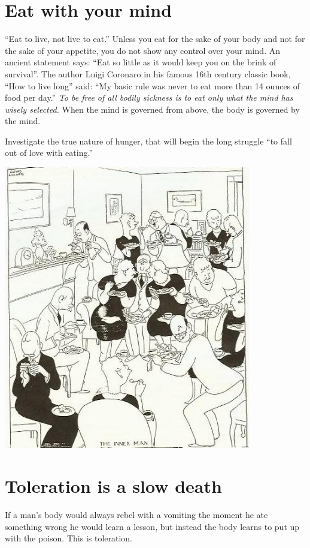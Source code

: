 \documentclass[12pt,letterpaper]{article}
\begin{document}
\section{Eat with your mind}

``Eat to live, not live to eat.'' Unless you eat for the sake of your
body and not for the sake of your appetite, you do not show any
control over your mind. An ancient statement says: ``Eat so little as
it would keep you on the brink of survival''. The author Luigi
Coronaro in his famous 16th century classic book, ``How to live
long'' said: ``My basic rule was never to eat more than 14 ounces of
food per day.'' \emph{To be free of all bodily sickness is to eat only
what the mind has wisely selected.} When the mind is governed from
above, the body is governed by the mind.

Investigate the true nature of hunger, that will begin the long
struggle ``to fall out of love with eating.''

\includegraphics[width=4.25in,bb= 0 0 454 521]{p20.jpg}


\section{Toleration is a slow death}
\label{sec:tiasd}

If a man's body would always rebel with a vomiting the moment he ate
something wrong he would learn a lesson, but instead the body learns
to put up with the poison. This is toleration.
\end{document}
